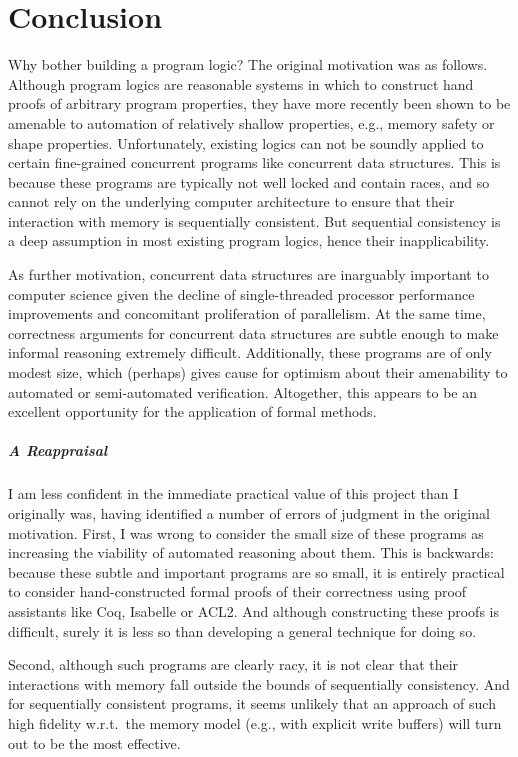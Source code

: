 \documentclass[11pt]{report}
\begin{document}
\chapter{Conclusion}
 Why bother building a program logic? The original motivation was as follows. Although program logics are reasonable systems in which to construct hand proofs of arbitrary program properties, they have more recently been shown to be amenable to automation of relatively shallow properties, e.g., memory safety or shape properties. Unfortunately, existing logics can not be soundly applied to certain fine-grained concurrent programs like concurrent data structures. This is because these programs are typically not well locked and contain races, and so cannot rely on the underlying computer architecture to ensure that their interaction with memory is sequentially consistent. But sequential consistency is a deep assumption in most existing program logics, hence their inapplicability.

As further motivation, concurrent data structures are inarguably important to computer science given the decline of single-threaded processor performance improvements and concomitant proliferation of parallelism. At the same time, correctness arguments for concurrent data structures are subtle enough to make informal reasoning extremely difficult. Additionally, these programs are of only modest size, which (perhaps) gives cause for optimism about their amenability to automated or semi-automated verification. Altogether, this appears to be an excellent opportunity for the application of formal methods. 

\paragraph{A Reappraisal}

I am less confident in the immediate practical value of this project than I originally was, having identified a number of errors of judgment in the original motivation. First, I was wrong to consider the small size of these programs as increasing the viability of automated reasoning about them. This is backwards: because these subtle and important programs are so small, it is entirely practical to consider hand-constructed formal proofs of their correctness using proof assistants like Coq, Isabelle or ACL2. And although constructing these proofs is difficult, surely it is less so than developing a general technique for doing so. 

Second, although such programs are clearly racy, it is not clear that their interactions with memory fall outside the bounds of sequentially consistency. And for sequentially consistent programs, it seems unlikely that an approach of such high fidelity w.r.t.~the memory model (e.g., with explicit write buffers) will turn out to be the most effective. 
\end{document}
